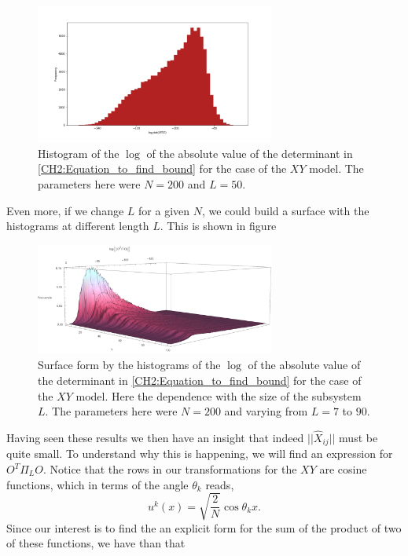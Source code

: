 \begin{figure}
\centering
\includegraphics[width = 0.7\textwidth]{Figures/Determinant_minors.png}
\caption{Histogram of the $\log$ of the absolute value of the determinant in \eqref{CH2:Equation_to_find_bound} for the case of the $XY$ model. The parameters here were $N=200$ and $L=50$.}
       \label{CH3:Determinant of minors}
\end{figure}

Even more, if we change $L$ for a given $N$, we could build a surface with the histograms at different length $L$. This is shown in figure 



\begin{figure}
\centering
\includegraphics[width = 0.7\textwidth]{Figures/Determinant_minors_surface.pdf}
\caption{Surface form by the histograms of the $\log$ of the absolute value of the determinant in \eqref{CH2:Equation_to_find_bound} for the case of the $XY$ model. Here the dependence with the size of the subsystem $L$.  The parameters here were $N=200$ and varying from $L=7$ to $90$.}
       \label{CH3:Determinant of minors_surface}
\end{figure}
Having seen these results we then have an insight that indeed $||\hat{X}_{ij}||$ must be quite small. To understand why this is happening, we will find an expression for $O^{T}\Pi_L O$. Notice that the rows in our transformations for the $XY$ are cosine functions, which in terms of the angle $\theta_k$ reads,
\begin{equation}
    u^{k}(x) = \sqrt{\frac{2}{N}}\cos{\theta_k x}.
\end{equation}
Since our interest is to find the an explicit form for the sum of the product of two of these functions, we have than that

